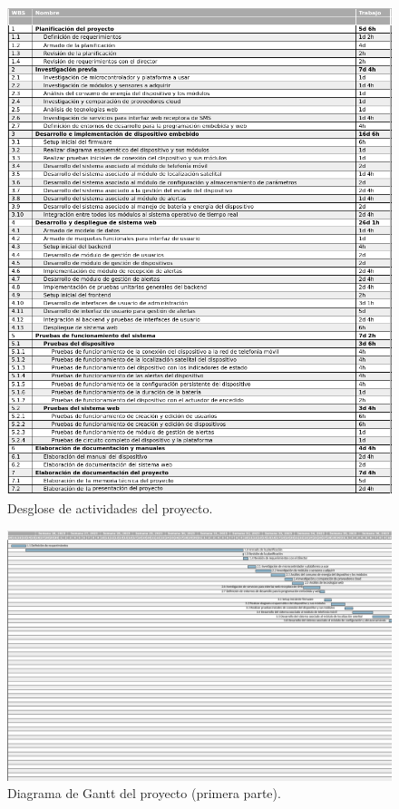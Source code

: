 \documentclass[
11pt, %
]{charter}
\begin{document}
\begin{figure}[htpb]
\centering 
\includegraphics[width=.9\textwidth]{./Figuras/WBS.png}
\caption{Desglose de actividades del proyecto.}
\label{fig:diagGanttWBS}
\end{figure}

\begin{landscape}
\begin{figure}[htpb]
\centering 
\includegraphics[width=\paperwidth]{./Figuras/Gantt1.png}
\caption{Diagrama de Gantt del proyecto (primera parte).}
\label{fig:diagGantt1}
\end{figure}
\end{landscape}
\end{document}
